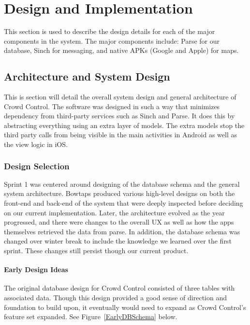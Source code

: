 

\chapter{Design  and Implementation}
This section is used to describe the design details for each of the major components 
in the system.   The major components include: Parse for our database, Sinch for messaging, 
and native APKs (Google and Apple) for maps.    
 
 \section{Architecture and System Design}
 This is section will detail the overall system design and general architecture of Crowd Control. The software was designed in such a way that minimizes dependency from third-party services such as Sinch and Parse.  It does this by abstracting everything using an extra layer of models.  The extra models stop the third party calls from being visible in the main activities in Android as well as the view logic in iOS.
 
 \subsection{Design Selection}
Sprint 1 was centered around designing of the database schema and the general system architecture. Bowtaps produced various high-level designs on both the front-end and back-end of the system that were deeply inspected before deciding on our current implementation. Later, the architecture evolved as the year progressed, and there were changes to the overall UX as well as how the apps themselves retrieved the data from parse. In addition, the database schema was changed over winter break to include the knowledge we learned over the first sprint. These changes still persist though our current product.

\subsubsection{Early Design Ideas}
The original database design for Crowd Control consisted of three tables with associated data. Though this design provided a good sense of direction and foundation to build upon, it eventually would need to expand as Crowd Control's feature set expanded. See Figure~\ref{EarlyDBSchema} below.

